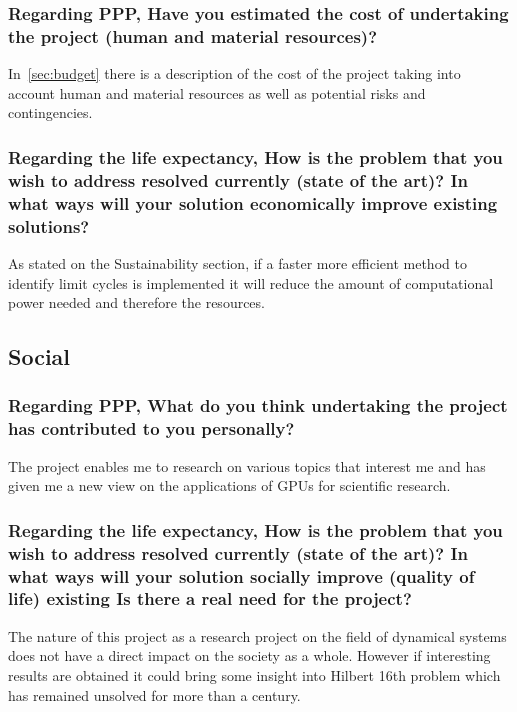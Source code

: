 \subsubsection*{Regarding PPP, Have you estimated the cost of undertaking the
project (human and material resources)?}

In~\cref{sec:budget} there is a description of the cost of the project taking
into account human and material resources as well as potential risks and
contingencies.

\subsubsection*{Regarding the life expectancy, How is the problem that you wish
to address resolved currently (state of the art)? In what ways will your
solution economically improve existing solutions?}

As stated on the Sustainability section, if a faster more efficient method to
identify limit cycles is implemented it will reduce the amount of computational
power needed and therefore the resources.


\subsection{Social}

\subsubsection*{Regarding PPP, What do you think undertaking the project has
contributed to you personally?}

The project enables me to research on various topics that interest me and has
given me a new view on the applications of GPUs for scientific research.

\subsubsection*{Regarding the life expectancy, How is the problem that you wish
to address resolved currently (state of the art)? In what ways will your
solution socially improve (quality of life) existing Is there a real need for
the project?}

The nature of this project as a research project on the field of dynamical
systems does not have a direct impact on the society as a whole. However if
interesting results are obtained it could bring some insight into Hilbert 16th
problem which has remained unsolved for more than a century.
